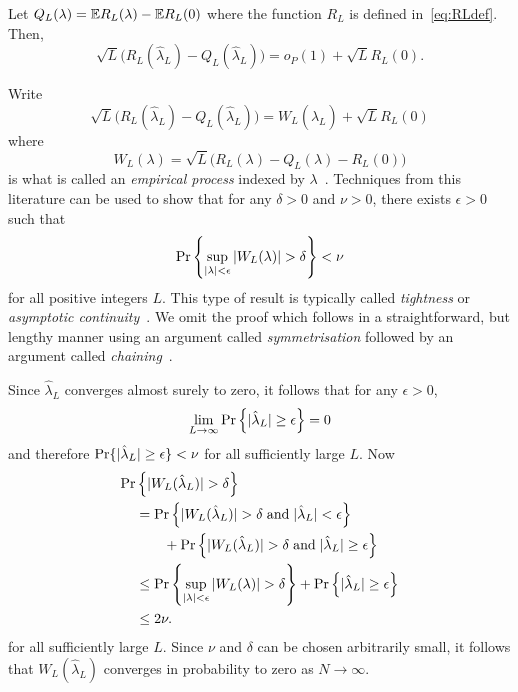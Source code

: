 \documentclass[journal]{IEEEtran}
\begin{document}
\begin{lemma}\label{lem:empiricprocc} Let $Q_L(\lambda) = {\mathbb E} R_L(\lambda) - {\mathbb E} R_L(0)$ where the function $R_L$ is defined in~\eqref{eq:RLdef}.  Then,
\[
\sqrt{L}\big( R_L(\hat{\lambda}_L) - Q_L(\hat{\lambda}_L) \big) = o_P(1) + \sqrt{L} R_L(0).
\]
\end{lemma}
\begin{IEEEproof}
Write
\[
\sqrt{L}\big( R_L(\hat{\lambda}_L) - Q_L(\hat{\lambda}_L) \big) = W_L(\hat{\lambda}_L) + \sqrt{L} R_L(0)
\]
where
\begin{equation}\label{eq:WLdef}
W_L(\lambda) = \sqrt{L}\big( R_L(\lambda) - Q_L(\lambda) - R_L(0) \big)
\end{equation}
is what is called an \emph{empirical process} indexed by $\lambda$~\cite{Pollard_asymp_empi_proc_1989,Pollard_new_ways_clts_1986,van2009empirical,Pollard_conv_stat_proc_1984}.  Techniques from this literature can be used to show that
for any $\delta > 0$ and $\nu > 0$, there exists $\epsilon > 0$ such that
\[
\Pr\left\{ \sup_{{\vert \lambda \vert}<\epsilon}{\vert W_L(\lambda) \vert} > \delta  \right\} < \nu
\]
for all positive integers $L$.  This type of result is typically called \emph{tightness} or \emph{asymptotic continuity}~\cite{Pollard_asymp_empi_proc_1989,van2009empirical,Billingsley1999_convergence_of_probability_measures}.  We omit the proof which follows in a straightforward, but lengthy manner using an argument called \emph{symmetrisation} followed by an argument called \emph{chaining}~\cite{Pollard_asymp_empi_proc_1989,van2009empirical}.

Since $\hat{\lambda}_L$ converges almost surely to zero, it follows that for any $\epsilon > 0$,
\[
\lim_{L\rightarrow\infty}{\operatorname{Pr}}\left\{ {\vert \hat{\lambda}_L \vert} \geq \epsilon \right\} = 0
\] 
and therefore ${\operatorname{Pr}}\{ {\vert \hat{\lambda}_L \vert} \geq \epsilon \} < \nu$ for all sufficiently large $L$.  Now
\begin{align*}
  {\operatorname{Pr}}&\left\{{\vert  W_L(\hat{\lambda}_L)  \vert} > \delta \right\} \\
&= {\operatorname{Pr}}\left\{ {\vert W_L(\hat{\lambda}_L) \vert} > \delta \;\text{and} \; {\vert \hat{\lambda}_L \vert} < \epsilon \right\} \\
&\hspace{0.7cm} + {\operatorname{Pr}}\left\{ {\vert W_L(\hat{\lambda}_L) \vert} > \delta  \;\text{and} \; {\vert \hat{\lambda}_L \vert} \geq \epsilon \right\} \\
&\leq {\operatorname{Pr}}\left\{  \sup_{{\vert \lambda \vert} < \epsilon} {\vert  W_L(\lambda)  \vert} > \delta \right\} + {\operatorname{Pr}}\left\{ {\vert \hat{\lambda}_L \vert} \geq \epsilon \right\} \\
&\leq 2\nu.
\end{align*}
for all sufficiently large $L$.  Since $\nu$ and $\delta$ can be chosen arbitrarily small, it follows that $W_L(\hat{\lambda}_L)$ converges in probability to zero as $N\rightarrow\infty$.
\end{IEEEproof}
\end{document}
